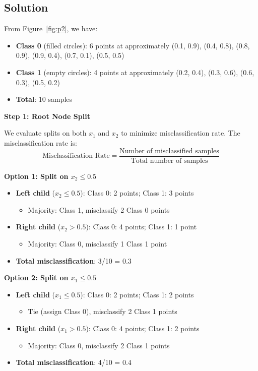\documentclass[11pt]{article}
\begin{document}
\subsection*{Solution}

From Figure~\ref{fig:p2}, we have:
\begin{itemize}
\item \textbf{Class 0} (filled circles): 6 points at approximately (0.1, 0.9), (0.4, 0.8), (0.8, 0.9), (0.9, 0.4), (0.7, 0.1), (0.5, 0.5)
\item \textbf{Class 1} (empty circles): 4 points at approximately (0.2, 0.4), (0.3, 0.6), (0.6, 0.3), (0.5, 0.2)
\item \textbf{Total}: 10 samples
\end{itemize}

\textbf{Step 1: Root Node Split}

We evaluate splits on both $x_1$ and $x_2$ to minimize misclassification rate. The misclassification rate is:
\[
\text{Misclassification Rate} = \frac{\text{Number of misclassified samples}}{\text{Total number of samples}}
\]

\textbf{Option 1: Split on $x_2 \leq 0.5$}
\begin{itemize}
\item \textbf{Left child} ($x_2 \leq 0.5$): Class 0: 2 points; Class 1: 3 points
  \begin{itemize}
  \item Majority: Class 1, misclassify 2 Class 0 points
  \end{itemize}
\item \textbf{Right child} ($x_2 > 0.5$): Class 0: 4 points; Class 1: 1 point
  \begin{itemize}
  \item Majority: Class 0, misclassify 1 Class 1 point
  \end{itemize}
\item \textbf{Total misclassification}: 3/10 = 0.3
\end{itemize}

\textbf{Option 2: Split on $x_1 \leq 0.5$}
\begin{itemize}
\item \textbf{Left child} ($x_1 \leq 0.5$): Class 0: 2 points; Class 1: 2 points
  \begin{itemize}
  \item Tie (assign Class 0), misclassify 2 Class 1 points
  \end{itemize}
\item \textbf{Right child} ($x_1 > 0.5$): Class 0: 4 points; Class 1: 2 points
  \begin{itemize}
  \item Majority: Class 0, misclassify 2 Class 1 points
  \end{itemize}
\item \textbf{Total misclassification}: 4/10 = 0.4
\end{itemize}
\end{document}
